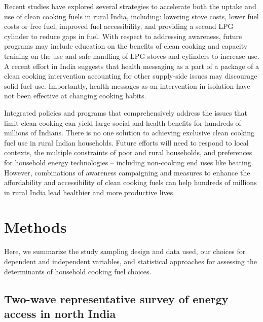 \documentclass[11pt,english]{article}
\theoremstyle{plain} \newtheorem{claim}{Claim}
\theoremstyle{plain} \newtheorem{prop}{Proposition}
\theoremstyle{plain} \newtheorem{hypo}{Hypothesis}
\begin{document}
Recent studies have explored several strategies to accelerate both the uptake and use of clean cooking fuels in rural India, including: lowering stove costs\citep{Pattanayaketal2019,Menghwanietal2019}, lower fuel costs or free fuel\citep{Pillarisettietal2019}, improved fuel accessibility\citep{Pattanayaketal2019,Pillarisettietal2019}, and providing a second LPG cylinder to reduce gaps in fuel\citep{Pillarisettietal2019}. With respect to addressing awareness, future programs may include education on the benefits of clean cooking and capacity training on the use and safe handling of LPG stoves and cylinders to increase use. A recent effort in India suggests that health messaging as a part of a package of a clean cooking intervention accounting for other supply-side issues may discourage solid fuel use\citep{Pillarisettietal2019}. Importantly, health messages as an intervention in isolation have not been effective at changing cooking habits\citep{Shankaretal2014}. 

Integrated policies and programs that comprehensively address the issues that limit clean cooking can yield large social and health benefits for hundreds of millions of Indians. There is no one solution to achieving exclusive clean cooking fuel use in rural Indian households. Future efforts will need to respond to local contexts, the multiple constraints of poor and rural households, and preferences for household energy technologies -- including non-cooking end uses like heating. However, combinations of awareness campaigning and measures to enhance the affordability and accessibility of clean cooking fuels can help hundreds of millions in rural India lead healthier and more productive lives. 


\clearpage

\section*{Methods}

Here, we summarize the study sampling design and data used, our choices for dependent and independent variables, and statistical approaches for assessing the determinants of household cooking fuel choices. 

\subsection*{Two-wave representative survey of energy access in north India}
\end{document}
